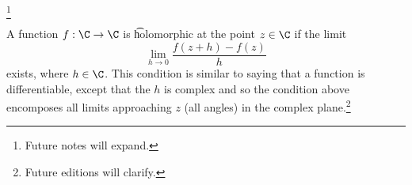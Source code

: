 
\footnote{Future notes will expand.}


A function $f: \C \to \C$ is \t{holomorphic} at the point $z \in \C$ if the limit
\[
  \lim_{h \to 0} \frac{f(z + h) - f(z)}{h}
\]
exists, where $h \in \C$.
This condition is similar to saying that a function is differentiable, except that the $h$ is complex and so the condition above encomposes all limits approaching $z$ (all angles) in the complex plane.\footnote{Future editions will clarify.}

\blankpage
